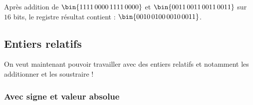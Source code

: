 \begin{exemple}
  Après addition de $\bin{1111\,0000\,1111\,0000}$ et
  $\bin{0011\,0011\,0011\,0011}$ sur $16$ bits, le registre résultat contient :
  $\bin{0010\,0100\,0010\,0011}$.
\end{exemple}
   
\subsection{Entiers relatifs}

On veut maintenant pouvoir travailler avec des entiers relatifs et notamment les additionner et les soustraire !

\subsubsection{Avec signe et valeur absolue}

